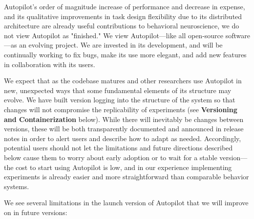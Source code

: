 


 Autopilot's order of magnitude increase of performance and decrease in expense, and its qualitative improvements in task design flexibility due to its distributed architecture are already useful contributions to behavioral neuroscience, we do not view Autopilot as "finished." We view Autopilot---like all open-source software---as an evolving project. We are invested in its development, and will be continually working to fix bugs, make its use more elegant, and add new features in collaboration with its users. 

We expect that as the codebase matures and other researchers use Autopilot in new, unexpected ways that some fundamental elements of its structure may evolve. We have built version logging into the structure of the system so that changes will not compromise the replicability of experiments (see \textbf{Versioning and Containerization} below). While there will inevitably be changes between versions, these will be both transparently documented and announced in release notes in order to alert users and describe how to adapt as needed. Accordingly, potential users should not let the limitations and future directions described below cause them to worry about early adoption or to wait for a stable version---the cost to start using Autopilot is low, and in our experience implementing experiments is already easier and more straightforward than comparable behavior systems. 

\vspace{12pt}

\noindent We see several limitations in the launch version of Autopilot that we will improve on in future versions:



